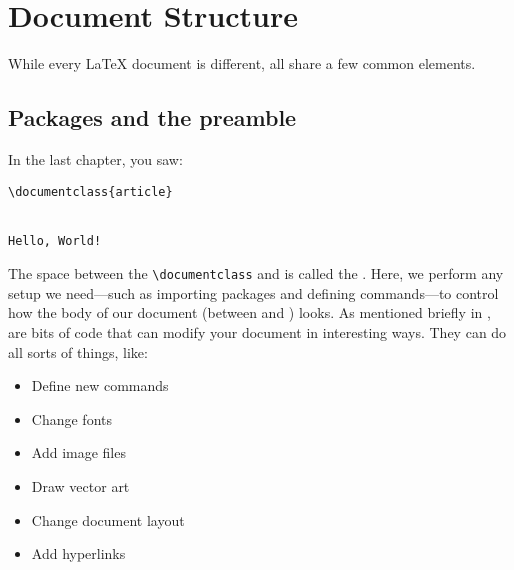 \chapter{Document Structure}
\label{structure}

While every \LaTeX{} document is different,
all share a few common elements.

\section{Packages and the preamble}
In the last chapter, you saw:
\begin{leftfigure}
\begin{lstlisting}
\documentclass{article}


Hello, World!

\end{lstlisting}
\end{leftfigure}
The space between the \verb|\documentclass| and \verb||
is called the .
Here, we perform any setup we need---such as importing packages
and defining commands---to control how the body of our document
(between \verb|| and \verb||) looks.
As mentioned briefly in ,
 are bits of code that can modify your document
in interesting ways.
They can do all sorts of things, like:
\begin{multicols}{2}
\begin{itemize}
\item Define new commands
\item Change fonts
\item Add image files
\item Draw vector art
\item Change document layout
\item Add hyperlinks
\end{itemize}
\end{multicols}

